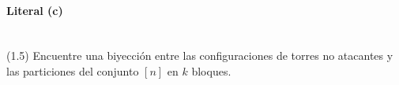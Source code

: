\paragraph{Literal (c)}\mbox{}\\
(1.5) Encuentre una biyección entre las configuraciones de torres no atacantes y las particiones del conjunto \([n]\) en \(k\) bloques.